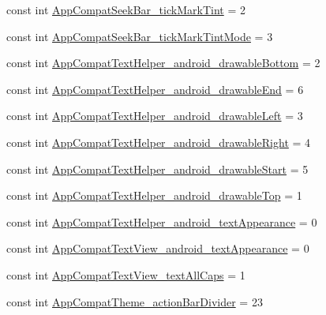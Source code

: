 \begin{DoxyCompactItemize}
const int \mbox{\hyperlink{class_f_w_p_s___app_1_1_droid_1_1_resource_1_1_styleable_a57bbb8f5a46d8c98c8cd4214d1983dcf}{App\+Compat\+Seek\+Bar\+\_\+tick\+Mark\+Tint}} = 2
\item 
const int \mbox{\hyperlink{class_f_w_p_s___app_1_1_droid_1_1_resource_1_1_styleable_ad78d1ae709909566485da6e7d4ed3b37}{App\+Compat\+Seek\+Bar\+\_\+tick\+Mark\+Tint\+Mode}} = 3
\item 
const int \mbox{\hyperlink{class_f_w_p_s___app_1_1_droid_1_1_resource_1_1_styleable_a4e29e056c3e761fa941917e2844fd53e}{App\+Compat\+Text\+Helper\+\_\+android\+\_\+drawable\+Bottom}} = 2
\item 
const int \mbox{\hyperlink{class_f_w_p_s___app_1_1_droid_1_1_resource_1_1_styleable_a3514fda2c96495844555be16a575b530}{App\+Compat\+Text\+Helper\+\_\+android\+\_\+drawable\+End}} = 6
\item 
const int \mbox{\hyperlink{class_f_w_p_s___app_1_1_droid_1_1_resource_1_1_styleable_aa6edf23315e1392d84275be88ba29143}{App\+Compat\+Text\+Helper\+\_\+android\+\_\+drawable\+Left}} = 3
\item 
const int \mbox{\hyperlink{class_f_w_p_s___app_1_1_droid_1_1_resource_1_1_styleable_ae7cc26bff62779156c50977b6abf5b0b}{App\+Compat\+Text\+Helper\+\_\+android\+\_\+drawable\+Right}} = 4
\item 
const int \mbox{\hyperlink{class_f_w_p_s___app_1_1_droid_1_1_resource_1_1_styleable_a2aa6c367fd5a4491bb174f7734c71e01}{App\+Compat\+Text\+Helper\+\_\+android\+\_\+drawable\+Start}} = 5
\item 
const int \mbox{\hyperlink{class_f_w_p_s___app_1_1_droid_1_1_resource_1_1_styleable_a363b48a36d8ca0781e7338c27c8980f4}{App\+Compat\+Text\+Helper\+\_\+android\+\_\+drawable\+Top}} = 1
\item 
const int \mbox{\hyperlink{class_f_w_p_s___app_1_1_droid_1_1_resource_1_1_styleable_a07be74689462c524b688a97d4ee88603}{App\+Compat\+Text\+Helper\+\_\+android\+\_\+text\+Appearance}} = 0
\item 
const int \mbox{\hyperlink{class_f_w_p_s___app_1_1_droid_1_1_resource_1_1_styleable_a24f3bd6fe4779ace5c7aa2fd5deeba28}{App\+Compat\+Text\+View\+\_\+android\+\_\+text\+Appearance}} = 0
\item 
const int \mbox{\hyperlink{class_f_w_p_s___app_1_1_droid_1_1_resource_1_1_styleable_a00481db62260e32fad54acbe03735601}{App\+Compat\+Text\+View\+\_\+text\+All\+Caps}} = 1
\item 
const int \mbox{\hyperlink{class_f_w_p_s___app_1_1_droid_1_1_resource_1_1_styleable_afe4b7d37d8e8d819d63b56f9a80405a5}{App\+Compat\+Theme\+\_\+action\+Bar\+Divider}} = 23

\end{DoxyCompactItemize}
